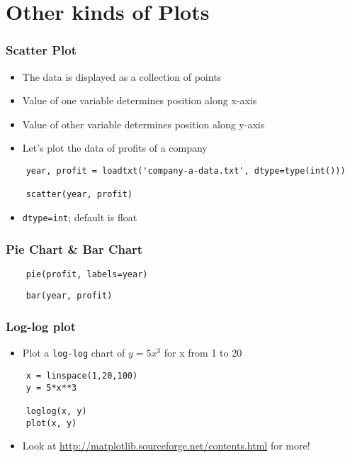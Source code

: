 \section{Other kinds of Plots}

\begin{frame}[fragile]
  \frametitle{Scatter Plot}
  \begin{itemize}
  \item The data is displayed as a collection of points
  \item Value of one variable determines position along x-axis
  \item Value of other variable determines position along y-axis
  \item Let's plot the data of profits of a company
  \end{itemize}
  \begin{lstlisting}
    year, profit = loadtxt('company-a-data.txt', dtype=type(int()))

    scatter(year, profit)
  \end{lstlisting}
  \begin{itemize}
  \item \alert{\texttt{dtype=int}; default is float} 
  \end{itemize}
\end{frame}

\begin{frame}[fragile]
  \frametitle{Pie Chart \& Bar Chart}
  \begin{lstlisting}
    pie(profit, labels=year)
  \end{lstlisting}

  \begin{lstlisting}
    bar(year, profit)
  \end{lstlisting}
\end{frame}

\begin{frame}[fragile]
  \frametitle{Log-log plot}
  \begin{itemize}
  \item Plot a \texttt{log-log} chart of $y=5x^3$ for x from 1 to 20
  \end{itemize}
  \begin{lstlisting}
    x = linspace(1,20,100)
    y = 5*x**3

    loglog(x, y)
    plot(x, y)
  \end{lstlisting}
  \begin{itemize}
  \item Look at \url{http://matplotlib.sourceforge.net/contents.html}
    for more!
  \end{itemize}
\end{frame}

